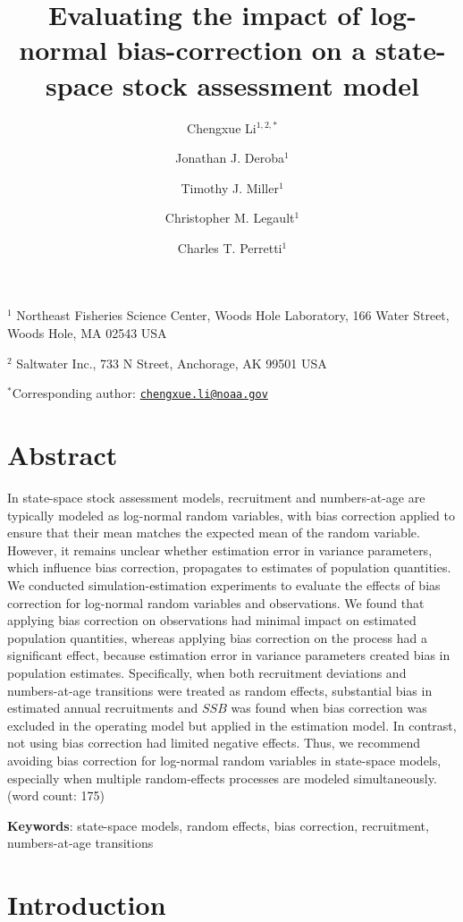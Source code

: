 \documentclass[
  12pt,
]{article}
\title{Evaluating the impact of log-normal bias-correction on a
state-space stock assessment model}
\author{Chengxue Li\(^{1,2,*}\) \and Jonathan J.
Deroba\(^1\) \and Timothy J. Miller\(^1\) \and Christopher M.
Legault\(^1\) \and Charles T. Perretti\(^1\)}
\date{}
\begin{document}
\maketitle

\(^1\) Northeast Fisheries Science Center, Woods Hole Laboratory, 166
Water Street, Woods Hole, MA 02543 USA

\(^2\) Saltwater Inc., 733 N Street, Anchorage, AK 99501 USA

\(^*\)Corresponding author:
\href{mailto:chengxue.li@noaa.gov}{\nolinkurl{chengxue.li@noaa.gov}}

\pagebreak

\section*{Abstract}\label{abstract}

In state-space stock assessment models, recruitment and numbers-at-age
are typically modeled as log-normal random variables, with bias
correction applied to ensure that their mean matches the expected mean
of the random variable. However, it remains unclear whether estimation
error in variance parameters, which influence bias correction,
propagates to estimates of population quantities. We conducted
simulation-estimation experiments to evaluate the effects of bias
correction for log-normal random variables and observations. We found
that applying bias correction on observations had minimal impact on
estimated population quantities, whereas applying bias correction on the
process had a significant effect, because estimation error in variance
parameters created bias in population estimates. Specifically, when both
recruitment deviations and numbers-at-age transitions were treated as
random effects, substantial bias in estimated annual recruitments and
\(SSB\) was found when bias correction was excluded in the operating
model but applied in the estimation model. In contrast, not using bias
correction had limited negative effects. Thus, we recommend avoiding
bias correction for log-normal random variables in state-space models,
especially when multiple random-effects processes are modeled
simultaneously. (word count: 175)

\textbf{Keywords}: state-space models, random effects, bias correction,
recruitment, numbers-at-age transitions

\pagebreak

\section{Introduction}\label{introduction}
\end{document}
